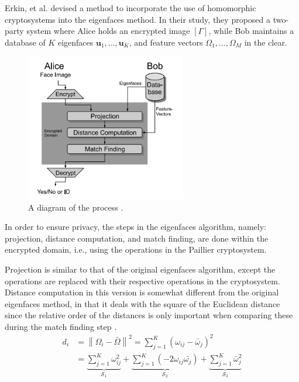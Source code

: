 
Erkin, et al. \cite{hutchison_privacy-preserving_2009-2} devised a method to incorporate the use of homomorphic cryptosystems into the eigenfaces method. In their study, they proposed a two-party system where Alice holds an encrypted image $\left[\Gamma\right]$, while Bob maintains a database of $K$ eigenfaces $\mathbf{u}_1, \ldots, \mathbf{u}_K$, and feature vectors $\Omega_1, \ldots, \Omega_M$ in the clear.

\begin{figure}[!h]
    \centering
    \includegraphics[width=7cm]{figures/secure_eigenfaces.png}
    \caption{A diagram of the process \cite{hutchison_privacy-preserving_2009-2}.}
\end{figure}


In order to ensure privacy, the steps in the eigenfaces algorithm, namely: projection, distance computation, and match finding, are done within the encrypted domain, i.e., using the operations in the Paillier cryptosystem. 

Projection is similar to that of the original eigenfaces algorithm, except the operations are replaced with their respective operations in the cryptosystem. Distance computation in this version is somewhat different from the original eigenfaces method, in that it deals with the square of the Euclidean distance since the relative order of the distances is only important when comparing these during the match finding step \cite{hutchison_privacy-preserving_2009-2}.
\begin{align*}
    d_i &= \left\lVert \Omega_i - \bar{\Omega} \right\rVert ^2 = \sum_{j=1}^{K} \left(\omega_{ij} - \bar{\omega}_j\right)^2 \\
        &= \underbrace{\sum_{j=1}^{K} \omega_{ij}^2}_{\mathcal{S}_1} + \underbrace{\sum_{j=1}^{K} \left(-2 \omega_{ij} \bar{\omega_j}\right)}_{\mathcal{S}_2} + \underbrace{\sum_{j=1}^{K} \bar{\omega}_{j}^2}_{\mathcal{S}_3} 
\end{align*}

